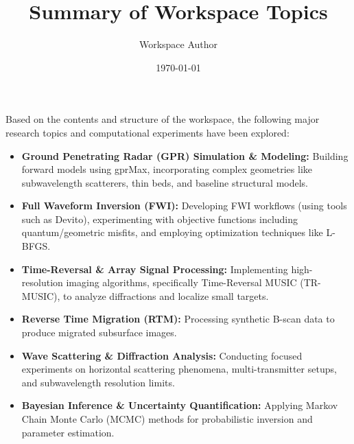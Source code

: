 \documentclass{article}
\title{Summary of Workspace Topics}
\author{Workspace Author}
\date{\today}
\begin{document}
\maketitle

Based on the contents and structure of the workspace, the following major research topics and computational experiments have been explored:

\begin{itemize}
    \item \textbf{Ground Penetrating Radar (GPR) Simulation \& Modeling:} 
    Building forward models using gprMax, incorporating complex geometries like subwavelength scatterers, thin beds, and baseline structural models.

    \item \textbf{Full Waveform Inversion (FWI):} 
    Developing FWI workflows (using tools such as Devito), experimenting with objective functions including quantum/geometric misfits, and employing optimization techniques like L-BFGS.

    \item \textbf{Time-Reversal \& Array Signal Processing:} 
    Implementing high-resolution imaging algorithms, specifically Time-Reversal MUSIC (TR-MUSIC), to analyze diffractions and localize small targets.

    \item \textbf{Reverse Time Migration (RTM):} 
    Processing synthetic B-scan data to produce migrated subsurface images.

    \item \textbf{Wave Scattering \& Diffraction Analysis:} 
    Conducting focused experiments on horizontal scattering phenomena, multi-transmitter setups, and subwavelength resolution limits.

    \item \textbf{Bayesian Inference \& Uncertainty Quantification:} 
    Applying Markov Chain Monte Carlo (MCMC) methods for probabilistic inversion and parameter estimation.
\end{itemize}
\end{document}
